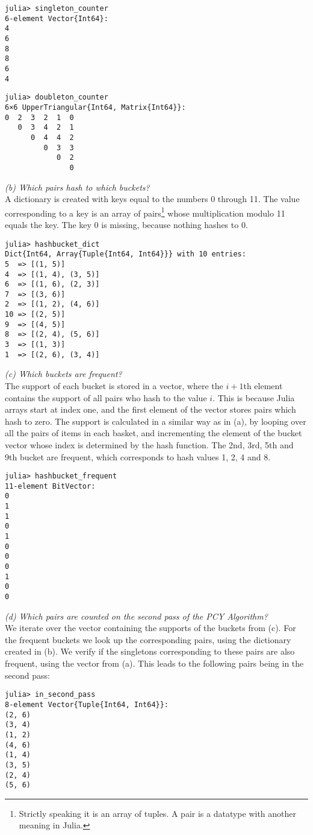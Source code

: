 \documentclass{article}
\begin{document}
\begin{verbatim}
julia> singleton_counter
6-element Vector{Int64}:
4
6
8
8
6
4
\end{verbatim}
\begin{verbatim}
julia> doubleton_counter
6×6 UpperTriangular{Int64, Matrix{Int64}}:
0  2  3  2  1  0
   0  3  4  2  1
      0  4  4  2
         0  3  3
            0  2
               0
\end{verbatim}
\textit{(b) Which pairs hash to which buckets?}
\\
A dictionary is created with keys equal to the numbers 0 through 11.
The value corresponding to a key is an array of pairs\footnote{Strictly speaking it is an array of tuples. A pair is a datatype with another meaning in Julia.} whose multiplication modulo 11 equals the key.
The key 0 is missing, because nothing hashes to 0.
\begin{verbatim}
julia> hashbucket_dict
Dict{Int64, Array{Tuple{Int64, Int64}}} with 10 entries:
5  => [(1, 5)]
4  => [(1, 4), (3, 5)]
6  => [(1, 6), (2, 3)]
7  => [(3, 6)]
2  => [(1, 2), (4, 6)]
10 => [(2, 5)]
9  => [(4, 5)]
8  => [(2, 4), (5, 6)]
3  => [(1, 3)]
1  => [(2, 6), (3, 4)]
\end{verbatim}
\textit{(c) Which buckets are frequent?}
\\
The support of each bucket is stored in a vector, where the $i{+}1$th element contains the support of all pairs who hash to the value $i$. This is because Julia arrays start at index one, and the first element of the vector stores pairs which hash to zero. The support is calculated in a similar way as in (a), by looping over all the pairs of items in each basket, and incrementing the element of the bucket vector whose index is determined by the hash function.
The 2nd, 3rd, 5th and 9th bucket are frequent, which corresponds to hash values 1, 2, 4 and 8.
\begin{verbatim}
julia> hashbucket_frequent
11-element BitVector:
0
1
1
0
1
0
0
0
1
0
0
\end{verbatim}
\textit{(d) Which pairs are counted on the second pass of the PCY Algorithm?}
\\
We iterate over the vector containing the supports of the buckets from (c). For the frequent buckets we look up the corresponding pairs, using the dictionary created in (b). We verify if the singletons corresponding to these pairs are also frequent, using the vector from (a). This leads to the following pairs being in the second pass:
\begin{verbatim}
julia> in_second_pass
8-element Vector{Tuple{Int64, Int64}}:
(2, 6)
(3, 4)
(1, 2)
(4, 6)
(1, 4)
(3, 5)
(2, 4)
(5, 6)
\end{verbatim}
\end{document}
